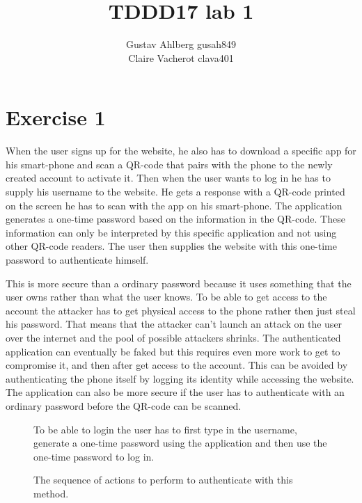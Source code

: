 \documentclass[12pt]{article}
\title{TDDD17 lab 1}
\author{Gustav Ahlberg gusah849 \\ Claire Vacherot clava401}
\begin{document}
\maketitle

\newpage

\section*{Exercise 1}

When the user signs up for the website, he also has to download a specific app for his smart-phone and scan a QR-code that pairs with the phone to the newly created account to activate it. Then when the user wants to log in he has to supply his username to the website. He gets a response with a QR-code printed on the screen he has to scan with the app on his smart-phone. The application generates a one-time password based on the information in the QR-code. These information can only be interpreted by this specific application and not using other QR-code readers. The user then supplies the website with this one-time password to authenticate himself.

This is more secure than a ordinary password because it uses something that the user owns rather than what the user knows. To be able to get access to the account the attacker has to get physical access to the phone rather then just steal his password. That means that the attacker can't launch an attack on the user over the internet and the pool of possible attackers shrinks. The authenticated application can eventually be faked but this requires even more work to get to compromise it, and then after get access to the account. This can be avoided by authenticating the phone itself by logging its identity while accessing the website. The application can also be more secure if the user has to authenticate with an ordinary password before the QR-code can be scanned.


\begin{figure}[H]
\caption{To be able to login the user has to first type in the username, generate a one-time password using the application and then use the one-time password to log in.}
\label{fig:use-case}
\end{figure}


\begin{figure}[H]
\caption{The sequence of actions to perform to authenticate with this method.}
\label{fig:sequence-diagram}
\end{figure}
\end{document}
